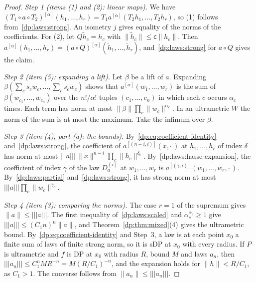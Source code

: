 \documentclass[11pt]{amsart}
\theoremstyle{definition}
\theoremstyle{remark}
\numberwithin{equation}{section}
\newcommand{\norm}[1]{\lVert #1\rVert}
\theoremstyle{plain}
\theoremstyle{definition}
\theoremstyle{plain}
\begin{document}
\begin{proof}
\emph{Step 1 (items (1) and (2): linear maps).} We have $(T_1\circ a\circ T_2)^{[\alpha]}(h_1,\dots,h_r)=T_1a^{[\alpha]}(T_2h_1,\dots,T_2h_r)$, so (1) follows from~\eqref{dp:laws:strong}. An isometry $j$ gives equality of the norms of the coefficients. For (2), let $Q\tilde h_c=h_c$ with $\norm{\tilde h_c}\le\mathsf c\norm{h_c}$. Then $a^{[\alpha]}(h_1,\dots,h_r)=(a\circ Q)^{[\alpha]}(\tilde h_1,\dots,\tilde h_r)$, and~\eqref{dp:laws:strong} for $a\circ Q$ gives the claim.

\emph{Step 2 (item (5): expanding a lift).} Let $\beta$ be a lift of $a$. Expanding $\beta(\sum_cs_cw_c,\dots,\sum_cs_cw_c)$ shows that $a^{[\alpha]}(w_1,\dots,w_r)$ is the sum of $\beta(w_{c_1},\dots,w_{c_n})$ over the $n!/\alpha!$ tuples $(c_1,\dots,c_n)$ in which each $c$ occurs $\alpha_c$ times. Each term has norm at most $\norm\beta\prod_c\norm{w_c}^{\alpha_c}$. In an ultrametric $W$ the norm of the sum is at most the maximum. Take the infimum over $\beta$.

\emph{Step 3 (item (4), part (a): the bounds).} By~\eqref{dp:eq:coefficient-identity} and~\eqref{dp:laws:strong}, the coefficient of $a^{[(n-i,i)]}(x,\cdot\,)$ at $h_1,\dots,h_r$ of index $\delta$ has norm at most $\lvert\!\lvert\!\lvert a\rvert\!\rvert\!\rvert\,\norm x^{n-i}\prod_c\norm{h_c}^{\delta_c}$. By~\eqref{dp:laws:hasse-expansion}, the coefficient of index $\gamma$ of the law $D^{(i)}_a$ at $w_1,\dots,w_r$ is $a^{[(\gamma,i)]}(w_1,\dots,w_r,\cdot\,)$. By~\eqref{dp:laws:partial} and~\eqref{dp:laws:strong}, it has strong norm at most $\lvert\!\lvert\!\lvert a\rvert\!\rvert\!\rvert\prod_c\norm{w_c}^{\gamma_c}$.

\emph{Step 4 (item (3): comparing the norms).} The case $r=1$ of the supremum gives $\norm a\le\lvert\!\lvert\!\lvert a\rvert\!\rvert\!\rvert$. The first inequality of~\eqref{dp:laws:scaled} and $\alpha_c^{\alpha_c}\ge1$ give $\lvert\!\lvert\!\lvert a\rvert\!\rvert\!\rvert\le(C_1n)^n\norm a$, and Theorem~\ref{dp:thm:mixed}(4) gives the ultrametric bound. By~\eqref{dp:eq:coefficient-identity} and Step~3, a law is at each point $x_0$ a finite sum of laws of finite strong norm, so it is sDP at $x_0$ with every radius. If $P$ is ultrametric and $f$ is DP at $x_0$ with radius $R$, bound $M$ and laws $a_n$, then $\lvert\!\lvert\!\lvert a_n\rvert\!\rvert\!\rvert\le C_1^nMR^{-n}=M(R/C_1)^{-n}$, and the expansion holds for $\norm h<R/C_1$, as $C_1>1$. The converse follows from $\norm{a_n}\le\lvert\!\lvert\!\lvert a_n\rvert\!\rvert\!\rvert$.


\end{proof}
\end{document}
